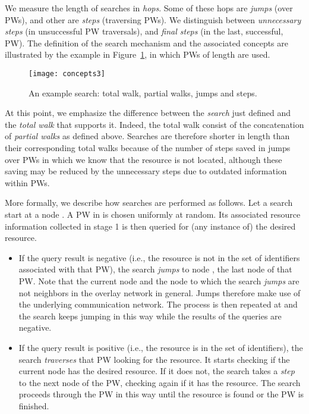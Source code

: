 \documentclass[]{elsarticle}
\begin{document}
\begin{enumerate}
We measure the length of searches in \emph{hops}. Some of these hops are \emph{jumps} (over PWs), and other are \emph{steps} (traversing PWs). We distinguish between \emph{unnecessary steps} (in unsuccessful PW traversals), and \emph{final steps} (in the last, successful, PW).
The definition of the search mechanism and the associated concepts are illustrated by the example in Figure~\ref{fig:concepts}, in which PWs of length  are used.

\begin{figure}
 \centering
 \texttt{[image: concepts3]}
 \caption{An example search: total walk, partial walks, jumps and steps.}
 \label{fig:concepts}
\end{figure}

At this point, we emphasize the difference between the \emph{search} just defined and the \emph{total walk} that supports it. Indeed, the total walk consist of the concatenation of \emph{partial walks} as defined above. Searches are therefore shorter in length than their corresponding total walks because of the number of steps saved in jumps over PWs in which we know that the resource is not located, although these saving may be reduced by the unnecessary steps due to outdated information within PWs.

More formally, we describe how searches are performed as follows. Let a search start at a node . A PW in  is chosen uniformly at random. Its associated resource information collected in stage 1 is then queried for (any instance of) the desired resource. 

\begin{itemize}
\item
If the query result is negative (i.e., the resource is not in the set of identifiers associated with that PW), the search \emph{jumps} to node , the last node of that PW. Note that the current node and the node to which the search \emph{jumps} are not neighbors in the overlay network in general. Jumps therefore make use of the underlying communication network.
The process is then repeated at  and the search keeps jumping in this way while the results of the queries are negative. 

\item
If the query result is positive (i.e., the resource is in the set of identifiers), the search \emph{traverses} that PW looking for the resource. It starts checking if the current node has the desired resource. If it does not, the search takes a \emph{step} to the next node of the PW, checking again if it has the resource. The search proceeds through the PW in this way until the resource is found or the PW is finished.


\end{itemize}
\end{enumerate}
\end{document}

